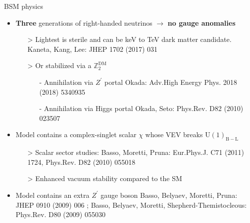 \documentclass[10pt,xcolor=dvipsnames,mathserif]{beamer}
\renewcommand{\(}{\left(}
\renewcommand{\)}{\right)}
\renewcommand{\[}{\left[}
\renewcommand{\]}{\right]}
\newcommand{\U}[1]{\mathrm{U}(1)_{\mathrm{#1}}}			%
\newcommand{\blue}[0]{\color{blue}}
\newcommand{\red}[0]{\color{red}}
\begin{document}
\begin{frame}{BSM physics}
	
		\begin{itemize}
			\item \textbf{Three} generations of right-handed neutrinos $\to$ \textbf{\red no gauge anomalies}
			\begin{itemize}
				\item[>] Lightest is sterile and can be keV to TeV dark matter candidate. \\ {\blue \scriptsize  Kaneta, Kang, Lee: JHEP 1702 (2017) 031}
				\item[>] Or stabilized via a $\mathbb{Z}_2^{\mathrm{DM}}$
				\begin{itemize}
					\item[-] Annihilation via $Z^\prime$ portal {\scriptsize \blue Okada: Adv.High Energy Phys. 2018 (2018) 5340935}
					\item[-] Annihilation via Higgs portal {\scriptsize  \blue Okada, Seto: Phys.Rev. D82 (2010) 023507}
					\end{itemize}
			\end{itemize}
			\vskip2mm
			\item Model contains a complex-singlet scalar $\chi$ whose VEV breaks $\U{B-L}$
			\begin{itemize}
				\item[>] Scalar sector studies: {\scriptsize  \blue Basso, Moretti, Pruna: Eur.Phys.J. C71 (2011) 1724, Phys.Rev. D82 (2010) 055018}
				\vskip2mm
				\item[>] Enhanced vacuum stability compared to the SM
				
		\end{itemize}	
			\vskip2mm
			\item Model contains an extra $Z^\prime$ gauge boson {\scriptsize  \blue Basso, Belyaev, Moretti, Pruna: JHEP 0910 (2009) 006} ; {\scriptsize  \blue Basso, Belyaev, Moretti, Shepherd-Themistocleous: Phys.Rev. D80 (2009) 055030}
			 
		\end{itemize}
		
	
\end{frame}
\end{document}
